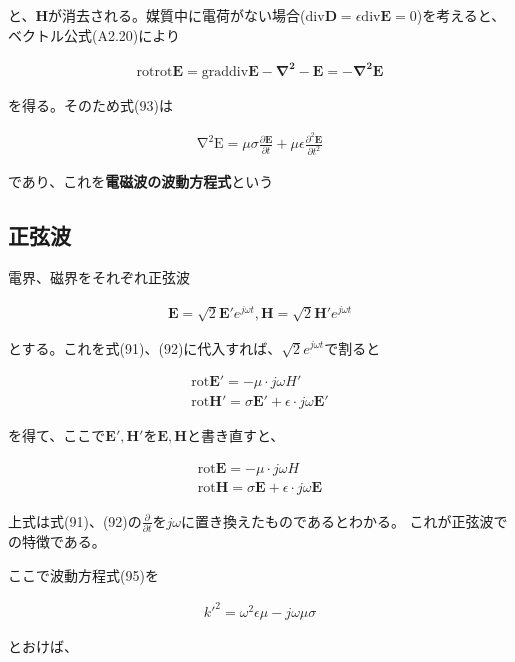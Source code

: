 \documentclass[7pt,uplatex,dvipdfmx,twocolumn]{jsarticle}
\begin{document}
と、$\bm{H}$が消去される。媒質中に電荷がない場合($\mathrm{div}\bm{D}=\epsilon\mathrm{div}\bm{E}=0$)を考えると、ベクトル公式(A2.20)により

\begin{align}
\mathrm{rot}\mathrm{rot}\bm{E}=\mathrm{grad}\mathrm{div}\bm{E}-\bm{\nabla ^2-E}=\bm{-\nabla ^2E}
\end{align}

を得る。そのため式(93)は

\begin{align}
\mathrm{\nabla ^2E}=\mu\sigma\frac{\partial \bm{E}}{\partial t}+\mu\epsilon\frac{\partial ^2\bm{E}}{\partial t^2}
\end{align}

であり、これを\textbf{電磁波の波動方程式}という

\subsection{正弦波}

電界、磁界をそれぞれ正弦波

\begin{align}
\bm{E}=\sqrt{2}\bm{E'}e^{j\omega t},\bm{H}=\sqrt{2}\bm{H'}e^{j\omega t}
\end{align}

とする。これを式(91)、(92)に代入すれば、$\sqrt{2}e^{j\omega t}$で割ると

\begin{align}
\mathrm{rot}\bm{E'}=-\mu\cdot j\omega H' \\
\mathrm{rot}\bm{H'}=\sigma\bm{E'}+\epsilon\cdot j\omega\bm{E'}
\end{align}

を得て、ここで$\bm{E',H'}$を$\bm{E,H}$と書き直すと、

\begin{align}
  \mathrm{rot}\bm{E}=-\mu\cdot j\omega H \\
  \mathrm{rot}\bm{H}=\sigma\bm{E}+\epsilon\cdot j\omega\bm{E}
\end{align}

上式は式(91)、(92)の$\frac{\partial}{\partial t}$を$j\omega$に置き換えたものであるとわかる。
これが正弦波での特徴である。

ここで波動方程式(95)を

\begin{align}
k'^2=\omega ^2\epsilon\mu-j\omega\mu\sigma
\end{align}

とおけば、
\end{document}
